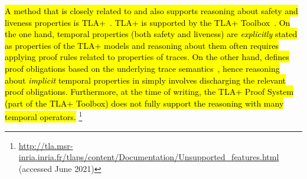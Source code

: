 \hl{%
  A method that is closely related to \mbox{\EventB} and also supports
  reasoning about safety and liveness properties is
  TLA+~\mbox{\cite{DBLP:books/aw/Lamport2002}}. TLA+ is supported by
  the TLA+ Toolbox~\mbox{\cite{DBLP:journals/corr/abs-1912-10633}}.
  On the one hand, temporal properties (both safety and liveness) are
  \emph{explicitly} stated as properties of the TLA+ models and
  reasoning about them often requires applying proof rules related to
  properties of traces. On the other hand, \mbox{\EventB} defines
  proof obligations based on the underlying trace
  semantics~\mbox{\cite{abrial10:_model_event_b,hoang2016ltl,hudon16:_unit_b_method}},
  hence reasoning about \emph{implicit} temporal properties in
  \mbox{\EventB} simply involves discharging the relevant proof
  obligations. Furthermore, at the time of writing, the TLA+ Proof
  System (part of the TLA+ Toolbox) does not fully support the
  reasoning with many temporal operators.%
}%
\footnote{\url{http://tla.msr-inria.inria.fr/tlaps/content/Documentation/Unsupported_features.html}
  (accessed June 2021)}







